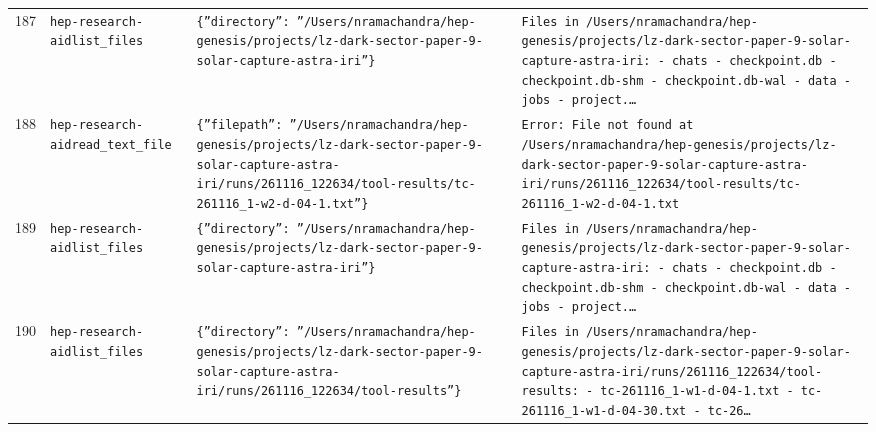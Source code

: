 \documentclass[11pt,a4paper]{article}
\begin{document}
\begin{longtable}{@{}p{}p{}p{}p{}@{}}
187 & \texttt{hep-research-aid}\newline\texttt{list\_\allowbreak{}files} & \texttt{\{''directory'':\allowbreak{} ''/\allowbreak{}Users/\allowbreak{}nramachandra/\allowbreak{}hep-genesis/\allowbreak{}projects/\allowbreak{}lz-dark-sector-paper-9-solar-capture-astra-iri''\}\allowbreak{}} & \texttt{Files in /\allowbreak{}Users/\allowbreak{}nramachandra/\allowbreak{}hep-genesis/\allowbreak{}projects/\allowbreak{}lz-dark-sector-paper-9-solar-capture-astra-iri:\allowbreak{}   - chats   - checkpoint.db   - checkpoint.db-shm   - checkpoint.db-wal   - data   - jobs   - project.\ldots{}\allowbreak{}} \\
188 & \texttt{hep-research-aid}\newline\texttt{read\_\allowbreak{}text\_\allowbreak{}file} & \texttt{\{''filepath'':\allowbreak{} ''/\allowbreak{}Users/\allowbreak{}nramachandra/\allowbreak{}hep-genesis/\allowbreak{}projects/\allowbreak{}lz-dark-sector-paper-9-solar-capture-astra-iri/\allowbreak{}runs/\allowbreak{}261116\_\allowbreak{}122634/\allowbreak{}tool-results/\allowbreak{}tc-261116\_\allowbreak{}1-w2-d-04-1.txt''\}\allowbreak{}} & \texttt{Error:\allowbreak{} File not found at /\allowbreak{}Users/\allowbreak{}nramachandra/\allowbreak{}hep-genesis/\allowbreak{}projects/\allowbreak{}lz-dark-sector-paper-9-solar-capture-astra-iri/\allowbreak{}runs/\allowbreak{}261116\_\allowbreak{}122634/\allowbreak{}tool-results/\allowbreak{}tc-261116\_\allowbreak{}1-w2-d-04-1.txt} \\
189 & \texttt{hep-research-aid}\newline\texttt{list\_\allowbreak{}files} & \texttt{\{''directory'':\allowbreak{} ''/\allowbreak{}Users/\allowbreak{}nramachandra/\allowbreak{}hep-genesis/\allowbreak{}projects/\allowbreak{}lz-dark-sector-paper-9-solar-capture-astra-iri''\}\allowbreak{}} & \texttt{Files in /\allowbreak{}Users/\allowbreak{}nramachandra/\allowbreak{}hep-genesis/\allowbreak{}projects/\allowbreak{}lz-dark-sector-paper-9-solar-capture-astra-iri:\allowbreak{}   - chats   - checkpoint.db   - checkpoint.db-shm   - checkpoint.db-wal   - data   - jobs   - project.\ldots{}\allowbreak{}} \\
190 & \texttt{hep-research-aid}\newline\texttt{list\_\allowbreak{}files} & \texttt{\{''directory'':\allowbreak{} ''/\allowbreak{}Users/\allowbreak{}nramachandra/\allowbreak{}hep-genesis/\allowbreak{}projects/\allowbreak{}lz-dark-sector-paper-9-solar-capture-astra-iri/\allowbreak{}runs/\allowbreak{}261116\_\allowbreak{}122634/\allowbreak{}tool-results''\}\allowbreak{}} & \texttt{Files in /\allowbreak{}Users/\allowbreak{}nramachandra/\allowbreak{}hep-genesis/\allowbreak{}projects/\allowbreak{}lz-dark-sector-paper-9-solar-capture-astra-iri/\allowbreak{}runs/\allowbreak{}261116\_\allowbreak{}122634/\allowbreak{}tool-results:\allowbreak{}   - tc-261116\_\allowbreak{}1-w1-d-04-1.txt   - tc-261116\_\allowbreak{}1-w1-d-04-30.txt   - tc-26\ldots{}\allowbreak{}} \\

\end{longtable}
\end{document}
